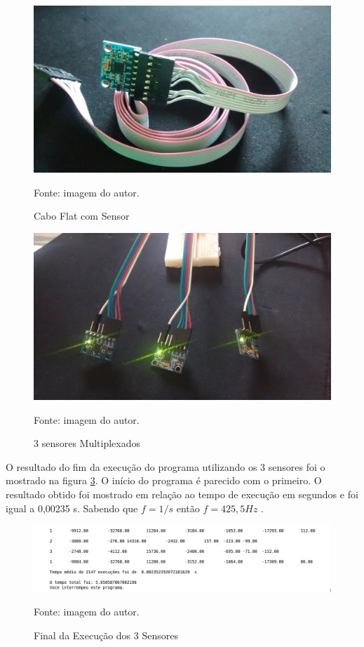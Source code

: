 			\begin{figure}[h]
			\centering
			\includegraphics[keepaspectratio=true,scale=0.075]{figuras/cabo_mpu.jpg}
			\caption{Cabo Flat com Sensor}
			\footnotesize Fonte: imagem do autor. 
			\label{cabo}	
		\end{figure}
		
		\begin{figure}[h]
		\centering
		\includegraphics[keepaspectratio=true,scale=0.075]{figuras/multiplexados.jpg}
		\caption{3 sensores Multiplexados}
		\footnotesize Fonte: imagem do autor. 
		\label{mult}	
	\end{figure}
	
	O resultado do fim da execução do programa utilizando os 3 sensores foi o mostrado na figura \ref{exec3}. O início do programa é parecido com o primeiro. O resultado obtido foi mostrado em relação ao tempo de execução em segundos e foi igual a 0,00235 s. Sabendo que $f = 1/s$ então $ f = 425,5 Hz $ .
	
	\begin{figure}[h]
		\centering
		\includegraphics[keepaspectratio=true,scale=0.6]{figuras/execut_3s.png}
		\caption{Final da Execução dos 3 Sensores}
		\footnotesize Fonte: imagem do autor. 
		\label{exec3}	
	\end{figure}
	
